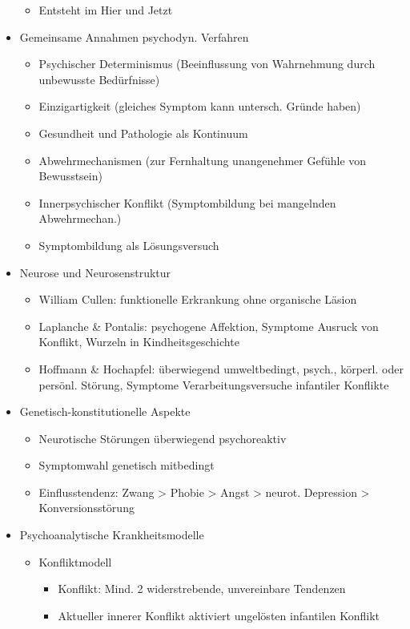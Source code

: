 \documentclass[11pt, paper=a4, twocolumn]{scrartcl}
\begin{document}
\begin{itemize}
\begin{itemize}
					\item Entsteht im Hier und Jetzt
				\end{itemize}
			\item Gemeinsame Annahmen psychodyn. Verfahren
				\begin{itemize}
					\item Psychischer Determinismus (Beeinflussung von Wahrnehmung durch unbewusste Bedürfnisse)
					\item Einzigartigkeit (gleiches Symptom kann untersch. Gründe haben)
					\item Gesundheit und Pathologie als Kontinuum
					\item Abwehrmechanismen (zur Fernhaltung unangenehmer Gefühle von Bewusstsein)
					\item Innerpsychischer Konflikt (Symptombildung bei mangelnden Abwehrmechan.)
					\item Symptombildung als Lösungsversuch
				\end{itemize}
			\item Neurose und Neurosenstruktur
				\begin{itemize}
					\item William Cullen: funktionelle Erkrankung ohne organische Läsion
					\item Laplanche \& Pontalis: psychogene Affektion, Symptome Ausruck von Konflikt, Wurzeln in Kindheitsgeschichte
					\item Hoffmann \& Hochapfel: überwiegend umweltbedingt, psych., körperl. oder persönl. Störung, Symptome 
						Verarbeitungsversuche infantiler Konflikte
				\end{itemize}
			\item Genetisch-konstitutionelle Aspekte
				\begin{itemize}
					\item Neurotische Störungen überwiegend psychoreaktiv
					\item Symptomwahl genetisch mitbedingt
					\item Einflusstendenz: Zwang > Phobie > Angst > neurot. Depression > Konversionsstörung
				\end{itemize}
			\item Psychoanalytische Krankheitsmodelle
				\begin{itemize}
					\item Konfliktmodell
						\begin{itemize}
							\item Konflikt: Mind. 2 widerstrebende, unvereinbare Tendenzen
							\item Aktueller innerer Konflikt aktiviert ungelösten infantilen Konflikt

\end{itemize}
\end{itemize}
\end{itemize}
\end{document}
